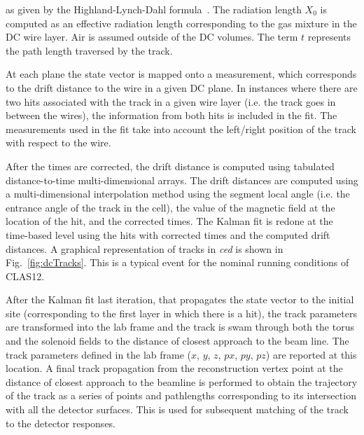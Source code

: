\noindent
as given by the Highland-Lynch-Dahl formula~\cite{Highland-Lynch-Dahl}. The radiation length $X_0$ is computed
as an effective radiation length corresponding to the gas mixture in the DC wire layer. Air is assumed outside of
the DC volumes. The term $t$ represents the path length traversed by the track.

At each plane the state vector is mapped onto a measurement, which corresponds to the drift distance to the
wire in a given DC plane.  In instances where there are two hits associated with the track in a given wire layer
(i.e. the track goes in between the wires), the information from both hits is included in the fit. The measurements
used in the fit take into account the left/right position of the track with respect to the wire.


After the times are corrected, the drift distance is computed using tabulated distance-to-time multi-dimensional
arrays. The drift distances are computed using a multi-dimensional interpolation method using the segment local
angle (i.e. the entrance angle of the track in the cell), the value of the magnetic field at the location of the hit, and
the corrected times. 
The Kalman fit is redone at the time-based level using the hits with corrected times and the
computed drift distances. A graphical representation of tracks in {\it ced} is shown in Fig.~\ref{fig:dcTracks}. This
is a typical event for the nominal running conditions of CLAS12. 

After the Kalman fit last iteration, that propagates the state vector to the initial site (corresponding to the first layer in which there is a hit), the track parameters are transformed into the lab frame and the track is swam through both the torus and the solenoid fields to the distance of closest approach to the beam line.  The track parameters defined in the lab frame ($x$, $y$, $z$, $px$, $py$, $pz$) are reported at this location.  A final track propagation from the reconstruction vertex point at the distance of closest approach to the beamline is performed to obtain the trajectory of the track as a series of points and pathlengths corresponding to its intersection with all the detector surfaces.  This is used for subsequent matching of the track to the detector responses.

